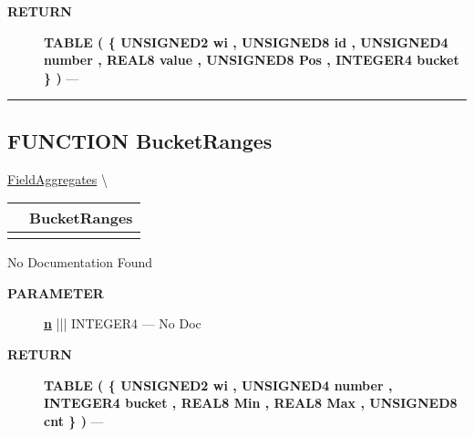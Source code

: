 \par
\begin{description}
\item [\colorbox{tagtype}{\color{white} \textbf{\textsf{RETURN}}}] \textbf{TABLE ( \{ UNSIGNED2 wi , UNSIGNED8 id , UNSIGNED4 number , REAL8 value , UNSIGNED8 Pos , INTEGER4 bucket \} )} --- 
\end{description}




\rule{\linewidth}{0.5pt}
\subsection*{\textsf{\colorbox{headtoc}{\color{white} FUNCTION}
BucketRanges}}

\hypertarget{ecldoc:ml_core.fieldaggregates.bucketranges}{}
\hspace{0pt} \hyperlink{ecldoc:ml_core.fieldaggregates}{FieldAggregates} \textbackslash 

{\renewcommand{\arraystretch}{1.5}
\begin{tabularx}{\textwidth}{|>{\raggedright\arraybackslash}l|X|}
\hline
\hspace{0pt}\mytexttt{\color{red} } & \textbf{BucketRanges} \\
\hline
\multicolumn{2}{|>{\raggedright\arraybackslash}X|}{\hspace{0pt}\mytexttt{\color{param} (Types.t\_Discrete n)}} \\
\hline
\end{tabularx}
}

\par





No Documentation Found






\par
\begin{description}
\item [\colorbox{tagtype}{\color{white} \textbf{\textsf{PARAMETER}}}] \textbf{\underline{n}} ||| INTEGER4 --- No Doc
\end{description}







\par
\begin{description}
\item [\colorbox{tagtype}{\color{white} \textbf{\textsf{RETURN}}}] \textbf{TABLE ( \{ UNSIGNED2 wi , UNSIGNED4 number , INTEGER4 bucket , REAL8 Min , REAL8 Max , UNSIGNED8 cnt \} )} --- 
\end{description}




